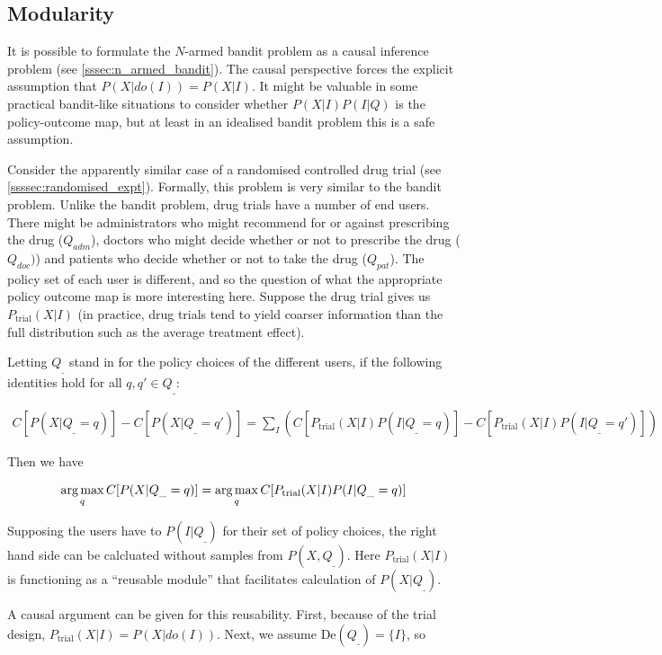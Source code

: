 \subsection{Modularity}

It is possible to formulate the $N$-armed bandit problem as a causal inference problem (see \ref{sssec:n_armed_bandit}). The causal perspective forces the  explicit assumption that $P(X|do(I))=P(X|I)$. It might be valuable in some practical bandit-like situations to consider whether $P(X|I)P(I|Q)$ is the policy-outcome map, but at least in an idealised bandit problem this is a safe assumption. 

Consider the apparently similar case of a randomised controlled drug trial (see \ref{ssssec:randomised_expt}). Formally, this problem is very similar to the bandit problem. Unlike the bandit problem, drug trials have a number of end users. There might be administrators who might recommend for or against prescribing the drug ($Q_{adm}$), doctors who might decide whether or not to prescribe the drug ($Q_{doc})$) and patients who decide whether or not to take the drug ($Q_{pat}$). The policy set of each user is different, and so the question of what the appropriate policy outcome map is more interesting here. Suppose the drug trial gives us $P_{\text{trial}}(X|I)$ (in practice, drug trials tend to yield coarser information than the full distribution such as the average treatment effect).

Letting $Q_\_$ stand in for the policy choices of the different users, if the following identities hold for all $q,q'\in Q_\_$:

\begin{align}
    C[P(X|Q_\_=q)] - C[P(X|Q_\_ = q')] = \sum_I \left(C[P_{\text{trial}}(X|I)P(I|Q_\_=q)] - C[P_{\text{trial}}(X|I)P(I|Q_\_=q')]\right)
\end{align}

Then we have

\begin{align}
    \operatorname*{arg\,max}_q C[P(X|Q_\_=q)] = \operatorname*{arg\,max}_q C[P_{\text{trial}}(X|I)P(I|Q_\_=q)]
\end{align}

Supposing the users have to $P(I|Q_\_)$ for their set of policy choices, the right hand side can be calcluated without samples from $P(X,Q_\_)$. Here $P_{\text{trial}}(X|I)$ is functioning as a ``reusable module'' that facilitates calculation of $P(X|Q_\_)$.

A causal argument can be given for this reusability. First, because of the trial design, $P_{\text{trial}}(X|I)=P(X|do(I))$. Next, we assume $\text{De}(Q_\_) = \{I\}$, so 

